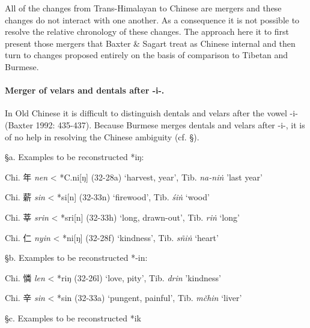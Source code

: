 All of the changes from Trans-Himalayan to Chinese are mergers and these
changes do not interact with one another. As a consequence it is not
possible to resolve the relative chronology of these changes. The
approach here it to first present those mergers that Baxter \& Sagart
treat as Chinese internal and then turn to changes proposed entirely on
the basis of comparison to Tibetan and Burmese.

\paragraph{Merger of velars and dentals after
-i-.} In Old Chinese it is difficult to distinguish dentals
and velars after the vowel -i- (Baxter 1992: 435-437). Because Burmese
merges dentals and velars after -i-, it is of no help in resolving the
Chinese ambiguity (cf. §).

§a. Examples to be reconstructed *iŋ:

\begin{description}
\item
Chi. 年 \emph{nen} \textless{} *C.n{}i{[}ŋ] (32-28a) `harvest, year',
Tib. {} \emph{na-niṅ }'last year'
\item
Chi. 薪 \emph{sin} \textless{} *si[n] (32-33n) `firewood', Tib. {} \emph{śiṅ} `wood'

\item
Chi. 莘 \emph{srin} \textless{} *sri[n] (32-33h) `long, drawn-out',
Tib. {} \emph{riṅ} `long'

\item
Chi. 仁  \emph{nyin} \textless{} *ni{[}ŋ] (32-28f) `kindness', Tib.{} \emph{sñiṅ} `heart'
\end{description}

§b. Examples to be reconstructed *-in:

\begin{description} \item
Chi. 憐 \emph{len} \textless{} *r{}iŋ (32-26l) `love, pity', Tib. {} \emph{drin }'kindness'
\end{description}

\begin{description} \item
Chi. 辛 \emph{sin} \textless{} *sin (32-33a) `pungent, painful', Tib. {} \emph{mčhin} `liver'
\end{description}

§c. Examples to be reconstructed *ik

